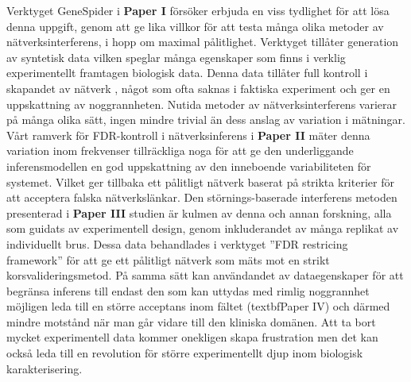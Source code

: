 Verktyget GeneSpider i \textbf{Paper I} försöker erbjuda en viss tydlighet för att lösa denna uppgift, genom att ge lika villkor för att testa många olika metoder av nätverksinterferens, i hopp om maximal pålitlighet. Verktyget tillåter  generation av  syntetisk data vilken speglar många egenskaper som finns i verklig experimentellt framtagen biologisk data. Denna data tillåter full kontroll i skapandet av nätverk , något som ofta saknas i faktiska experiment och ger en uppskattning av noggrannheten. Nutida metoder av nätverksinterferens varierar på många olika sätt, ingen mindre trivial än dess anslag av variation i mätningar. Vårt ramverk för FDR-kontroll i nätverksinferens i \textbf{Paper II} mäter denna variation inom frekvenser tillräckliga noga för att ge den underliggande inferensmodellen  en god uppskattning av den inneboende variabiliteten för systemet. Vilket ger tillbaka ett pålitligt nätverk baserat på strikta kriterier för att acceptera falska nätverkslänkar. Den störnings-baserade interferens metoden presenterad i \textbf{Paper III}  studien är kulmen av denna och annan forskning, alla som guidats av experimentell design, genom inkluderandet av många replikat av individuellt brus. Dessa data behandlades i verktyget ”FDR restricing framework” för att ge ett pålitligt nätverk som mäts mot en strikt korsvalideringsmetod. På samma sätt kan användandet av dataegenskaper för att begränsa inferens till endast den som kan uttydas med rimlig noggrannhet möjligen leda till en större acceptans inom fältet (textbf{Paper IV}) och därmed mindre motstånd när man går vidare till den kliniska domänen. Att ta bort mycket experimentell data kommer onekligen skapa frustration men det kan också leda till en revolution för större experimentellt djup inom biologisk karakterisering. \\







